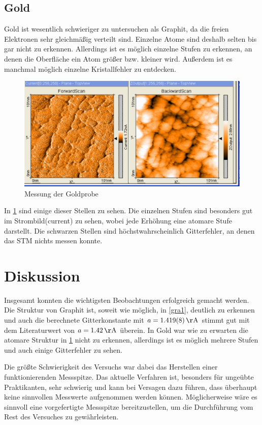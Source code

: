 \documentclass[
	a4paper,
	12pt,
	pagesize,
	ngerman
]{scrartcl}
\begin{document}
\subsection{Gold}
Gold ist wesentlich schwieriger zu untersuchen als Graphit, da die freien Elektronen sehr gleichmäßig verteilt sind. Einzelne Atome sind deshalb selten bis gar nicht zu erkennen. Allerdings ist es möglich einzelne Stufen zu erkennen, an denen die Oberfläche ein Atom größer bzw. kleiner wird. Außerdem ist es manchmal möglich einzelne Kristallfehler zu entdecken. 

\begin{figure}[h!]
	\centering
	\includegraphics[scale=0.6]{Stufe.png}
	\caption{Messung der Goldprobe}
	\label{gold}
\end{figure}


In \cref{gold} sind einige dieser Stellen zu sehen. Die einzelnen Stufen sind besonders gut im  Strombild(current) zu sehen, wobei jede Erhöhung eine atomare Stufe darstellt. Die schwarzen Stellen sind höchstwahrscheinlich Gitterfehler, an denen das STM nichts messen konnte.

\section{Diskussion}
Insgesamt konnten die wichtigsten Beobachtungen erfolgreich gemacht werden. Die Struktur von Graphit ist, soweit wie möglich, in \cref{gra1}, deutlich zu erkennen und auch die berechnete Gitterkonstante mit $a = \SI{1,419 \pm 0,008} {\AA}$ stimmt gut mit dem Literaturwert von $a = \SI{1,42} {\AA}$ überein. In Gold war wie zu erwarten die atomare Struktur in \cref{gold} nicht zu erkennen, allerdings ist es möglich mehrere Stufen und auch einige Gitterfehler zu sehen. 

Die größte Schwierigkeit des Versuchs war dabei das Herstellen einer funktionierenden Messspitze. Das aktuelle Verfahren ist, besonders für ungeübte Praktikanten, sehr schwierig und kann bei Versagen dazu führen, dass überhaupt keine sinnvollen Messwerte aufgenommen werden können. Möglicherweise wäre es sinnvoll eine vorgefertigte Messspitze bereitzustellen, um die Durchführung vom Rest des Versuches zu gewährleisten.
 
\end{document}

